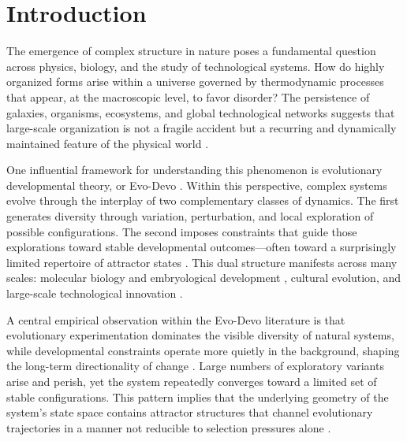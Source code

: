 \documentclass[12pt]{article}
\begin{document}
\begin{abstract}
The essay argues that the Evo-Devo distinction between evolutionary exploration and developmental convergence can be expressed mathematically as a decomposition of RSVP field dynamics into exploratory and constraint operators. This interpretation reframes Smart's ``95/5'' principle \cite{smart2009} not as a heuristic metaphor but as a precise statement about attractor geometry within high-dimensional dynamical systems \cite{strogatz1994,haken1983}. The resulting framework suggests that large-scale patterns in biological evolution, technological development, and collective intelligence may ultimately reflect the attractor structure of the scalar--vector--entropy manifold itself.
\end{abstract}

\newpage
\tableofcontents
\newpage

\section{Introduction}

The emergence of complex structure in nature poses a fundamental question across physics, biology, and the study of technological systems. How do highly organized forms arise within a universe governed by thermodynamic processes that appear, at the macroscopic level, to favor disorder? The persistence of galaxies, organisms, ecosystems, and global technological networks suggests that large-scale organization is not a fragile accident but a recurring and dynamically maintained feature of the physical world \cite{prigogine1984,morowitz2002}.

One influential framework for understanding this phenomenon is evolutionary developmental theory, or Evo-Devo \cite{smart2009}. Within this perspective, complex systems evolve through the interplay of two complementary classes of dynamics. The first generates diversity through variation, perturbation, and local exploration of possible configurations. The second imposes constraints that guide those explorations toward stable developmental outcomes---often toward a surprisingly limited repertoire of attractor states \cite{kauffman1993,holland1998}. This dual structure manifests across many scales: molecular biology and embryological development \cite{goodwin1994,thompson1917}, cultural evolution, and large-scale technological innovation \cite{gellmann1994,mitchell2009}.

A central empirical observation within the Evo-Devo literature is that evolutionary experimentation dominates the visible diversity of natural systems, while developmental constraints operate more quietly in the background, shaping the long-term directionality of change \cite{smart2009}. Large numbers of exploratory variants arise and perish, yet the system repeatedly converges toward a limited set of stable configurations. This pattern implies that the underlying geometry of the system's state space contains attractor structures that channel evolutionary trajectories in a manner not reducible to selection pressures alone \cite{kauffman1993,langton1990}.
\end{document}

